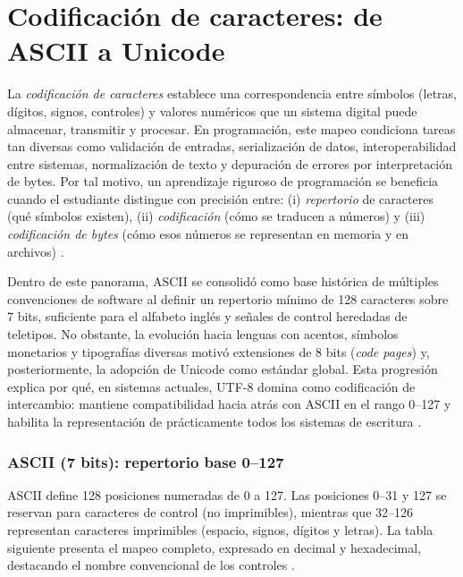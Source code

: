 \documentclass[12pt,twoside]{book}
\begin{document}
	\chapter{Codificación de caracteres: de ASCII a Unicode}
	\noindent
		La \emph{codificación de caracteres} establece una correspondencia entre símbolos (letras, dígitos, signos, controles) y valores numéricos que un sistema digital puede almacenar, transmitir y procesar. En programación, este mapeo condiciona tareas tan diversas como validación de entradas, serialización de datos, interoperabilidad entre sistemas, normalización de texto y depuración de errores por interpretación de bytes. Por tal motivo, un aprendizaje riguroso de programación se beneficia cuando el estudiante distingue con precisión entre: (i) \emph{repertorio} de caracteres (qué símbolos existen), (ii) \emph{codificación} (cómo se traducen a números) y (iii) \emph{codificación de bytes} (cómo esos números se representan en memoria y en archivos) \cite{Unicode2025Standard,ISOIEC6461991,Yergeau2003UTF8}.
		
		\noindent
		Dentro de este panorama, ASCII se consolidó como base histórica de múltiples convenciones de software al definir un repertorio mínimo de 128 caracteres sobre 7 bits, suficiente para el alfabeto inglés y señales de control heredadas de teletipos. No obstante, la evolución hacia lenguas con acentos, símbolos monetarios y tipografías diversas motivó extensiones de 8 bits (\emph{code pages}) y, posteriormente, la adopción de Unicode como estándar global. Esta progresión explica por qué, en sistemas actuales, UTF-8 domina como codificación de intercambio: mantiene compatibilidad hacia atrás con ASCII en el rango 0--127 y habilita la representación de prácticamente todos los sistemas de escritura \cite{Unicode2025Standard,Yergeau2003UTF8,ISOIEC1998Information}.
					
		\subsection{ASCII (7 bits): repertorio base 0--127}
		\noindent
			ASCII define 128 posiciones numeradas de 0 a 127. Las posiciones 0--31 y 127 se reservan para caracteres de control (no imprimibles), mientras que 32--126 representan caracteres imprimibles (espacio, signos, dígitos y letras). La tabla siguiente presenta el mapeo completo, expresado en decimal y hexadecimal, destacando el nombre convencional de los controles \cite{Cerf1969ASCII,ISOIEC6461991}.
			
\end{document}
